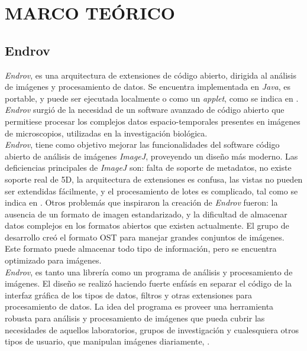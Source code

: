 \thispagestyle{empty}
\cleardoublepage
\chapter{MARCO TE\'ORICO}
\label{sec:dev}
\section{Endrov}
\label{sec:endrov}

\emph{Endrov}, es una arquitectura de extensiones de c\'odigo abierto,
dirigida al an\'alisis de im\'agenes y procesamiento de datos.
Se encuentra implementada en \emph{Java}, es portable, y puede ser ejecutada localmente o como 
un \emph{applet}, como se indica en \cite{web:endrov}. \emph{Endrov} surgi\'o
de la necesidad de un software avanzado de c\'odigo abierto que permitiese procesar 
los complejos datos espacio-temporales presentes en im\'agenes de microscopios, 
utilizadas en la investigaci\'on biol\'ogica.\\

\emph{Endrov}, tiene como objetivo mejorar las funcionalidades del software c\'odigo abierto
de an\'alisis de im\'agenes \emph{ImageJ}, proveyendo un dise\~no m\'as moderno. 
Las deficiencias principales de \emph{ImageJ} son: falta de soporte de metadatos,
no existe soporte real de 5D, la arquitectura de extensiones es confusa, las vistas
no pueden ser extendidas f\'acilmente, y el procesamiento de lotes es complicado, 
tal como se indica en \cite{web:endrovhome}.
Otros problem\'as que inspiraron la creaci\'on de \emph{Endrov} fueron: la ausencia de un 
formato de imagen estandarizado, y la dificultad
de almacenar datos complejos en los formatos abiertos que existen actualmente.
El grupo de desarrollo cre\'o el formato OST para manejar grandes conjuntos de im\'agenes.
Este formato puede almacenar todo tipo de informaci\'on, pero se 
encuentra optimizado para im\'agenes.\\

\emph{Endrov}, es tanto una librer\'ia como un programa de an\'alisis y procesamiento de 
im\'agenes. El dise\~no se realiz\'o haciendo fuerte enf\'as\'is en separar el c\'odigo
de la interfaz gr\'afica de los tipos de datos, filtros y otras extensiones para 
procesamiento de datos. La idea del programa es proveer una herramienta robusta para
an\'alisis y procesamiento de im\'agenes que pueda cubrir las necesidades de aquellos
laboratorios, grupos de investigaci\'on y cualesquiera otros tipos de usuario, que 
manipulan im\'agenes diariamente, \cite{web:endrov}.\\

